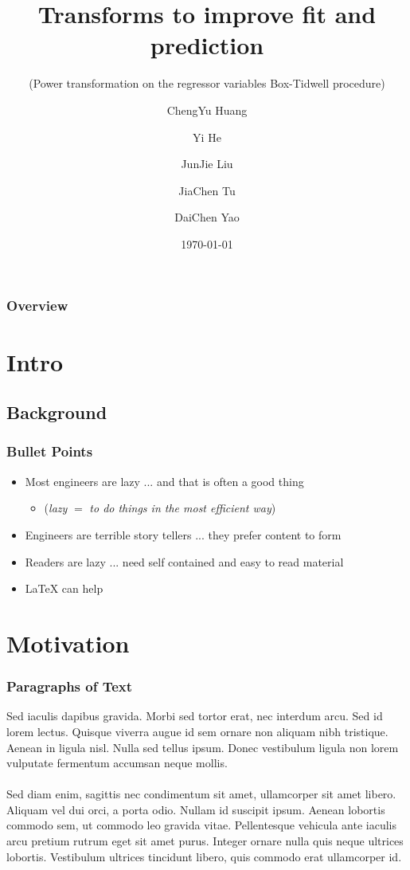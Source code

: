 \documentclass[10pt,aspectratio=32]{beamer}
\title{Transforms to improve fit and prediction \\ }
\subtitle{(Power transformation on the regressor variables Box-Tidwell procedure)}
\author{ChengYu Huang \and Yi He \and JunJie Liu \and JiaChen Tu \and DaiChen Yao}
\institute{United International College Statistics Year Three}
\date{\today}
\begin{document}
\AtBeginSection[]{\frame{\sectionpage}} %

\begin{frame}
	\titlepage
\end{frame}

\begin{frame}
	\frametitle{Overview}
	\vspace{-0.7cm}
	\tableofcontents
\end{frame}

\section{Intro}
\subsection{Background}
\begin{frame}
\frametitle{Bullet Points}
\vspace{-0.3cm}

\begin{itemize}
	\item Most engineers are lazy ... and that is often a good thing
	\begin{itemize}
		\item (\textit{lazy} $=$ \textit{to do things in the most efficient way})
	\end{itemize}
	\item Engineers are terrible story tellers ... they prefer content to form
	\item Readers are lazy ... need self contained and easy to read material
	\item \LaTeX{} can help
\end{itemize}

 \end{frame}


\section{Motivation}
\begin{frame}
	\frametitle{Paragraphs of Text}
	\vspace{-0.8cm}
	Sed iaculis dapibus gravida. Morbi sed tortor erat, nec interdum arcu. Sed id lorem lectus. Quisque viverra augue id sem ornare non aliquam nibh tristique. Aenean in ligula nisl. Nulla sed tellus ipsum. Donec vestibulum ligula non lorem vulputate fermentum accumsan neque mollis.\\~\\

	Sed diam enim, sagittis nec condimentum sit amet, ullamcorper sit amet libero. Aliquam vel dui orci, a porta odio. Nullam id suscipit ipsum. Aenean lobortis commodo sem, ut commodo leo gravida vitae. Pellentesque vehicula ante iaculis arcu pretium rutrum eget sit amet purus. Integer ornare nulla quis neque ultrices lobortis. Vestibulum ultrices tincidunt libero, quis commodo erat ullamcorper id.
\end{frame}
\end{document}
